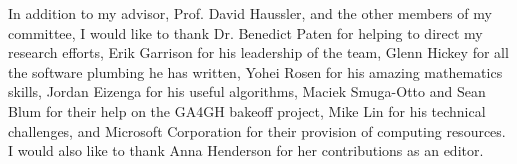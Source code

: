 \begin{frontmatter}
\begin{acknowledgements}
In addition to my advisor, Prof. David Haussler, and the other members of my committee, I would like to thank Dr. Benedict Paten for helping to direct my research efforts, Erik Garrison for his leadership of the \vg team, Glenn Hickey for all the software plumbing he has written, Yohei Rosen for his amazing mathematics skills, Jordan Eizenga for his useful algorithms, Maciek Smuga-Otto and Sean Blum for their help on the GA4GH bakeoff project, Mike Lin for his technical challenges, and Microsoft Corporation for their provision of computing resources. I would also like to thank Anna Henderson for her contributions as an editor.
\end{acknowledgements}

\end{frontmatter}
